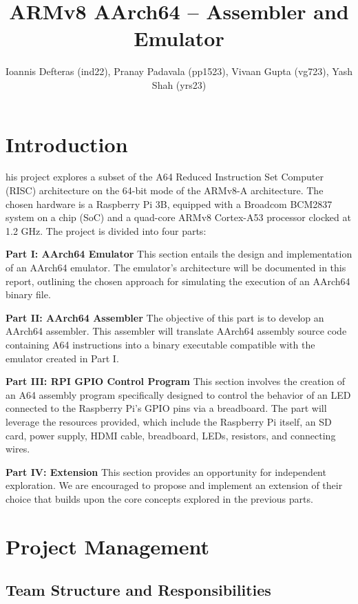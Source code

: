 \documentclass[9pt,a4paper,twoside]{tau-class/tau}
\title{ARMv8 AArch64 – Assembler and Emulator}
\author{Ioannis Defteras (ind22), Pranay Padavala (pp1523), Vivaan Gupta (vg723), Yash Shah (yrs23)}
\begin{document}
		
    \maketitle 
    \thispagestyle{firststyle} \tauabstract
    \tableofcontents

\section{Introduction}  
    his project explores a subset of the A64 Reduced Instruction Set Computer (RISC) architecture on the 64-bit mode of the ARMv8-A architecture. The chosen hardware is a Raspberry Pi 3B, equipped with a Broadcom BCM2837 system on a chip (SoC) and a quad-core ARMv8 Cortex-A53 processor clocked at 1.2 GHz. The project is divided into four parts: 
    
    \textbf{Part I: AArch64 Emulator }    
    This section entails the design and implementation of an AArch64 emulator. The emulator's architecture will be documented in this report, outlining the chosen approach for simulating the execution of an AArch64 binary file.
    
    \textbf{Part II: AArch64 Assembler }
    The objective of this part is to develop an AArch64 assembler. This assembler will translate AArch64 assembly source code containing A64 instructions into a binary executable compatible with the emulator created in Part I. 
    
    \textbf{Part III: RPI GPIO Control Program }    
    This section involves the creation of an A64 assembly program specifically designed to control the behavior of an LED connected to the Raspberry Pi's GPIO pins via a breadboard.  The part will leverage the resources provided, which include the Raspberry Pi itself, an SD card, power supply, HDMI cable, breadboard, LEDs, resistors, and connecting wires.  
    
    \textbf{Part IV: Extension }     
     This section provides an opportunity for independent exploration. We are encouraged to propose and implement an extension of their choice that builds upon the core concepts explored in the previous parts.
     
\section{Project Management}

    \subsection{Team Structure and Responsibilities}
\end{document}
